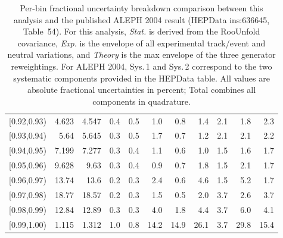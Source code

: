 \begin{table}[t!]
{\begin{tabular}{c  r r r r  r r r r  r r}
{[0.92,0.93)} & 4.623 & 4.547 & 0.4 & 0.5 & 1.0 & 0.8 & 1.4 & 2.1 & 1.8 & 2.3 \\
{[0.93,0.94)} & 5.64 & 5.645 & 0.3 & 0.5 & 1.7 & 0.7 & 1.2 & 2.1 & 2.1 & 2.2 \\
{[0.94,0.95)} & 7.199 & 7.277 & 0.3 & 0.4 & 1.1 & 0.6 & 1.0 & 1.5 & 1.6 & 1.7 \\
{[0.95,0.96)} & 9.628 & 9.63 & 0.3 & 0.4 & 0.9 & 0.7 & 1.8 & 1.5 & 2.1 & 1.7 \\
{[0.96,0.97)} & 13.74 & 13.6 & 0.2 & 0.3 & 2.4 & 0.6 & 4.6 & 1.5 & 5.2 & 1.7 \\
{[0.97,0.98)} & 18.77 & 18.57 & 0.2 & 0.3 & 1.5 & 0.5 & 2.0 & 3.7 & 2.6 & 3.7 \\
{[0.98,0.99)} & 12.84 & 12.89 & 0.3 & 0.3 & 4.0 & 1.8 & 4.4 & 3.7 & 6.0 & 4.1 \\
{[0.99,1.00)} & 1.115 & 1.312 & 1.0 & 0.8 & 14.2 & 14.9 & 26.1 & 3.7 & 29.8 & 15.4 \\
\hline
\end{tabular}
}%
\normalsize
\caption{Per-bin fractional uncertainty breakdown comparison between this analysis and the published ALEPH 2004 result (HEPData ins:636645, Table~54). For this analysis, \textit{Stat.} is derived from the RooUnfold covariance, \textit{Exp.} is the envelope of all experimental track/event and neutral variations, and \textit{Theory} is the max envelope of the three generator reweightings. For ALEPH 2004, Sys.\,1 and Sys.\,2 correspond to the two systematic components provided in the HEPData table. All values are absolute fractional uncertainties in percent; Total combines all components in quadrature.}
\label{tab:per_bin_uncertainty_breakdown_comparison}
\end{table}